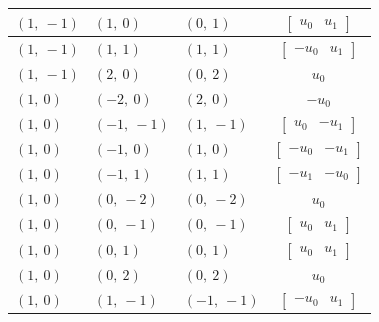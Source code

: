 \documentclass[11pt]{article}
\theoremstyle{definition}
\begin{document}
\begin{longtable}{|l|l|l|c|}
    \hline
    $\left( 1, \  -1\right)$ & $\left( 1, \  0\right)$ & $\left( 0, \  1\right)$ & $\left[\begin{matrix}u_{0} & u_{1}\end{matrix}\right]$ \\
    \hline
    $\left( 1, \  -1\right)$ & $\left( 1, \  1\right)$ & $\left( 1, \  1\right)$ & $\left[\begin{matrix}- u_{0} & u_{1}\end{matrix}\right]$ \\
    \hline
    $\left( 1, \  -1\right)$ & $\left( 2, \  0\right)$ & $\left( 0, \  2\right)$ & $u_{0}$ \\
    \hline
    $\left( 1, \  0\right)$ & $\left( -2, \  0\right)$ & $\left( 2, \  0\right)$ & $- u_{0}$ \\
    \hline
    $\left( 1, \  0\right)$ & $\left( -1, \  -1\right)$ & $\left( 1, \  -1\right)$ & $\left[\begin{matrix}u_{0} & - u_{1}\end{matrix}\right]$ \\
    \hline
    $\left( 1, \  0\right)$ & $\left( -1, \  0\right)$ & $\left( 1, \  0\right)$ & $\left[\begin{matrix}- u_{0} & - u_{1}\end{matrix}\right]$ \\
    \hline
    $\left( 1, \  0\right)$ & $\left( -1, \  1\right)$ & $\left( 1, \  1\right)$ & $\left[\begin{matrix}- u_{1} & - u_{0}\end{matrix}\right]$ \\
    \hline
    $\left( 1, \  0\right)$ & $\left( 0, \  -2\right)$ & $\left( 0, \  -2\right)$ & $u_{0}$ \\
    \hline
    $\left( 1, \  0\right)$ & $\left( 0, \  -1\right)$ & $\left( 0, \  -1\right)$ & $\left[\begin{matrix}u_{0} & u_{1}\end{matrix}\right]$ \\
    \hline
    $\left( 1, \  0\right)$ & $\left( 0, \  1\right)$ & $\left( 0, \  1\right)$ & $\left[\begin{matrix}u_{0} & u_{1}\end{matrix}\right]$ \\
    \hline
    $\left( 1, \  0\right)$ & $\left( 0, \  2\right)$ & $\left( 0, \  2\right)$ & $u_{0}$ \\
    \hline
    $\left( 1, \  0\right)$ & $\left( 1, \  -1\right)$ & $\left( -1, \  -1\right)$ & $\left[\begin{matrix}- u_{0} & u_{1}\end{matrix}\right]$ \\

\end{longtable}
\end{document}
